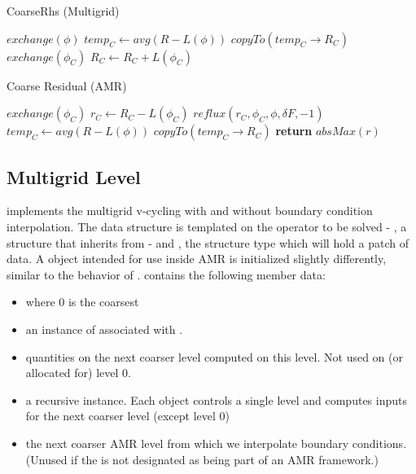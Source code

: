 \documentclass[12pt,a4paper]{article}
\begin{document}
\begin{algorithm}
\caption{CoarseRhs (Multigrid)}
\begin{algorithmic}[1]
\State $exchange(\phi)$
\State $temp_C \gets avg(R - L(\phi))$
\State $copyTo(temp_C\rightarrow R_C)$ 
\State $exchange(\phi_C)$
\State $R_C \gets R_C + L(\phi_C)$
\EndProcedure
\end{algorithmic}
\end{algorithm}

\begin{algorithm}
\caption{Coarse Residual (AMR)}
\begin{algorithmic}[1]
\State $exchange(\phi_C)$
\State $r_C \gets R_C - L(\phi_C)$
\State $reflux(r_C, \phi_C, \phi, \delta F,-1)$
\State $temp_C \gets avg(R - L(\phi))$
\State $copyTo(temp_C\rightarrow R_C)$ 
\State \textbf{return} $absMax(r)$
\EndProcedure
\end{algorithmic}
\end{algorithm}

\pagebreak
\subsection{Multigrid Level}

 implements the multigrid v-cycling with and without boundary condition interpolation. The data structure is templated on the operator to be solved - , a structure that inherits from  - and , the structure type which will hold a patch of data. A  object intended for use inside AMR is initialized slightly differently, similar to the behavior of .  contains the following member data:

\begin{itemize}
\item {} where 0 is the coarsest 
\item {} an instance of  associated with .
\item {}  quantities on the next coarser level computed on this level. Not used on (or allocated for) level 0. 
\item {} a recursive  instance. Each  object controls a single level and computes inputs for the next coarser level (except level 0)
\item {} the next coarser AMR level from which we interpolate boundary conditions. (Unused if the  is not designated as being part of an AMR framework.)
\end{itemize}
\end{document}
